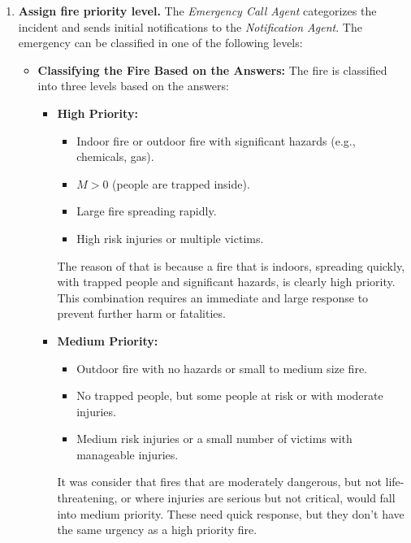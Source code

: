 \begin{enumerate}
    \item \textbf{Assign fire priority level.} The \textit{Emergency Call Agent} categorizes the incident and sends initial notifications 
    to the \textit{Notification Agent}. The emergency can be classified in one of the following levels: 
    \begin{itemize}
        \item \textbf{Classifying the Fire Based on the Answers:}  
        The fire is classified into three levels based on the answers:
        \begin{itemize}
            \item \textbf{High Priority:}
            \begin{itemize}
                \item Indoor fire or outdoor fire with significant hazards (e.g., chemicals, gas).
                \item $M > 0$ (people are trapped inside).
                \item Large fire spreading rapidly.
                \item High risk injuries or multiple victims.
            \end{itemize}
            The reason of that is because a fire that is indoors, spreading quickly, with trapped people and significant hazards, 
            is clearly high priority. This combination requires an immediate and large response to prevent further harm or fatalities.
            
        \item \textbf{Medium Priority:}
            \begin{itemize}
                \item Outdoor fire with no hazards or small to medium size fire.
                \item No trapped people, but some people at risk or with moderate injuries.
                \item Medium risk injuries or a small number of victims with manageable injuries.
            \end{itemize}
            It was consider that fires that are moderately dangerous, but not life-threatening, or where injuries are serious but
             not critical, would fall into medium priority. These need quick response, but they don't have the same urgency as a high 
             priority fire.
            

\end{itemize}
\end{itemize}
\end{enumerate}

